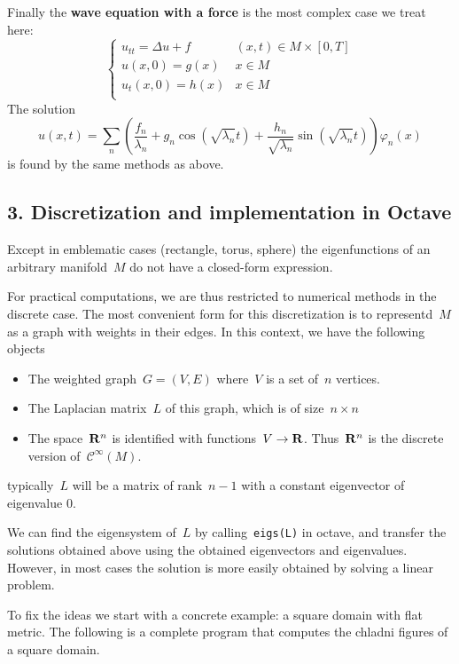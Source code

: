 Finally the {\bf wave equation with a force} is the most complex case we treat here:
$$
\begin{cases}
	u_{tt} = \Delta u +f& (x,t)\in M\times[0,T] \\
	u(x,0) = g(x) & x\in M \\
	u_t(x,0) = h(x) & x\in M \\
\end{cases}
$$
The solution
$$
	u(x,t)=\sum_n\left(
	\frac{f_n}{\lambda_n}
	+
	g_n\cos\left(\sqrt{\lambda_n} t\right)
	+
	\frac{h_n}{\sqrt{\lambda_n}}\sin\left(\sqrt{\lambda_n} t\right)
	\right)\varphi_n(x)
$$
is found by the same methods as above.


\subsection{3. Discretization and implementation in Octave}

Except in emblematic cases (rectangle, torus, sphere) the eigenfunctions of
an arbitrary manifold~$M$ do not have a closed-form expression.

For practical computations, we are thus restricted to numerical methods in the
discrete case.  The most convenient form for this discretization is to
representd~$M$ as a graph with weights in their edges.  In this context, we
have the following objects
\begin{itemize}
	\item The weighted graph~$G=(V,E)$ where~$V$ is a set of~$n$ vertices.
	\item The Laplacian matrix~$L$ of this graph, which is of
		size~$n\times n$
	\item The space~$\mathbf{R}^n$ is identified with functions~$V\to\mathbf{R}$.
		Thus~$\mathbf{R}^n$ is the discrete version of~$\mathcal{C}^\infty(M)$.
\end{itemize}
typically~$L$ will be a matrix of rank~$n-1$ with a constant eigenvector of
eigenvalue 0.

We can find the eigensystem of~$L$ by calling~\verb+eigs(L)+ in octave, and
transfer the solutions obtained above using the obtained eigenvectors and
eigenvalues.  However, in most cases the solution is more easily obtained by
solving a linear problem.

To fix the ideas we start with a concrete example: a square domain with flat
metric.  The following is a complete program that computes the chladni
figures of a square domain.

